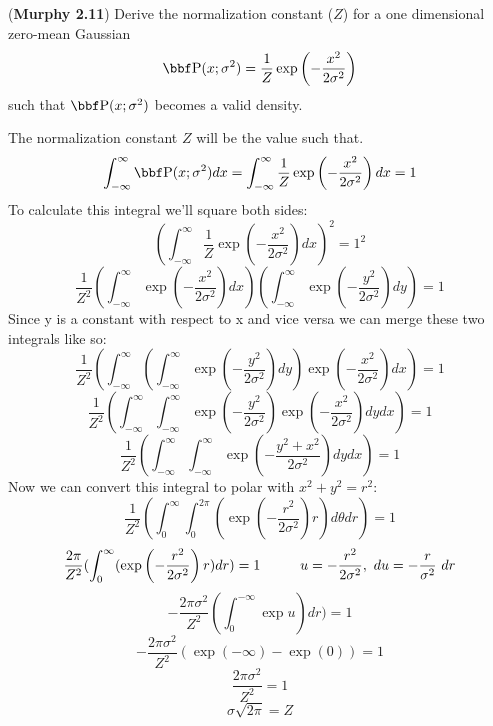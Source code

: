 \documentclass[12pt,letterpaper]{hmcpset}
\begin{document}
\begin{problem}[2]
	(\textbf{Murphy 2.11})
	Derive the normalization constant ($Z$) for a one dimensional
	zero-mean Gaussian
	\[
	\PP(x; \sigma^2) = \frac{1}{Z}\exp\left(-\frac{x^2}{2\sigma^2}\right)
	\]
	such that $\PP(x; \sigma^2)$ becomes a valid density.
\end{problem}
\begin{solution}
    The normalization constant $Z$ will be the value such that.
	$$\int_{-\infty}^{\infty}\PP(x; \sigma^2)dx = \int_{-\infty}^{\infty}\frac{1}{Z}\exp\left(-\frac{x^2}{2\sigma^2}\right)dx = 1$$
	To calculate this integral we'll square both sides:
	$$(\int_{-\infty}^{\infty}\frac{1}{Z}\exp\left(-\frac{x^2}{2\sigma^2}\right)dx)^2 = 1^2$$
	$$\frac{1}{Z^2}(\int_{-\infty}^{\infty}\exp\left(-\frac{x^2}{2\sigma^2}\right)dx)(\int_{-\infty}^{\infty}\exp\left(-\frac{y^2}{2\sigma^2}\right)dy) = 1$$
	Since y is a constant with respect to x and vice versa we can merge these two integrals like so:
	$$\frac{1}{Z^2}(\int_{-\infty}^{\infty}(\int_{-\infty}^{\infty}\exp\left(-\frac{y^2}{2\sigma^2}\right)dy)\exp\left(-\frac{x^2}{2\sigma^2}\right)dx) = 1$$
	$$\frac{1}{Z^2}(\int_{-\infty}^{\infty}\int_{-\infty}^{\infty}\exp\left(-\frac{y^2}{2\sigma^2}\right)\exp\left(-\frac{x^2}{2\sigma^2}\right)dydx) = 1$$
	$$\frac{1}{Z^2}(\int_{-\infty}^{\infty}\int_{-\infty}^{\infty}\exp\left(-\frac{y^2+x^2}{2\sigma^2}\right)dydx) = 1$$
	Now we can convert this integral to polar with $x^2+y^2 = r^2$:
	$$\frac{1}{Z^2}(\int_{0}^{\infty}\int_{0}^{2\pi}(\exp\left(-\frac{r^2}{2\sigma^2}\right)r)d\theta dr) = 1$$
	$$\frac{2\pi}{Z^2}(\int_{0}^{\infty}(\exp\left(-\frac{r^2}{2\sigma^2}\right)r)dr) = 1 \hspace{10mm} u = -\frac{r^2}{2\sigma^2},\ du = -\frac{r}{\sigma^2}\ dr$$
	$$-\frac{2\pi\sigma^2}{Z^2}(\int_{0}^{-\infty}\exp u)dr) = 1$$
	$$-\frac{2\pi\sigma^2}{Z^2}(\exp(-\infty) - \exp(0)) = 1$$
	$$\frac{2\pi\sigma^2}{Z^2} = 1$$
	$$\sigma\sqrt{2\pi} = Z$$
\end{solution}
\newpage
\end{document}
